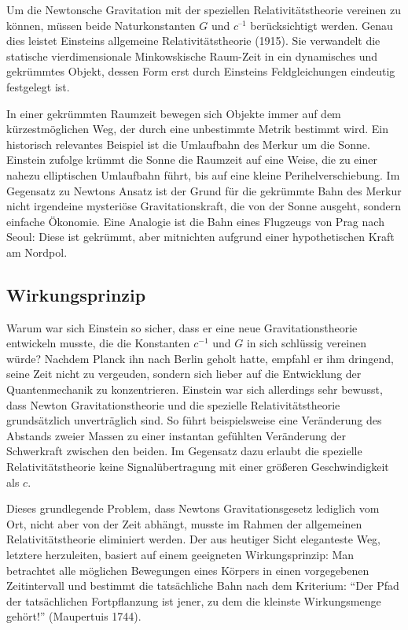 
\newpage {}
\label{sec:1100}

Um die Newtonsche Gravitation mit der speziellen Relativitätstheorie vereinen zu können, müssen beide Naturkonstanten $G$ und $c^{–1}$ berücksichtigt werden. Genau dies leistet Einsteins allgemeine Relativitätstheorie (1915). Sie verwandelt die statische vierdimensionale Minkowskische Raum-Zeit in ein dynamisches und gekrümmtes Objekt, dessen Form erst durch Einsteins Feldgleichungen eindeutig festgelegt ist.

In einer gekrümmten Raumzeit bewegen sich Objekte immer auf dem kürzestmöglichen Weg, der durch eine unbestimmte Metrik bestimmt wird. Ein historisch relevantes Beispiel ist die Umlaufbahn des Merkur um die Sonne. Einstein zufolge krümmt die Sonne die Raumzeit auf eine Weise, die zu einer nahezu elliptischen Umlaufbahn führt, bis auf eine kleine Perihelverschiebung. Im Gegensatz zu Newtons Ansatz ist der Grund für die gekrümmte Bahn des Merkur nicht irgendeine mysteriöse Gravitationskraft, die von der Sonne ausgeht, sondern einfache Ökonomie. Eine Analogie ist die Bahn eines Flugzeugs von Prag nach Seoul: Diese ist gekrümmt, aber mitnichten aufgrund einer hypothetischen Kraft am Nordpol.


\subsection*{Wirkungsprinzip}

Warum war sich Einstein so sicher, dass er eine neue Gravitationstheorie entwickeln musste, die die Konstanten $c^{−1}$ und $G$ in sich schlüssig vereinen würde? Nachdem Planck ihn nach Berlin geholt hatte, empfahl er ihm dringend, seine Zeit nicht zu vergeuden, sondern sich lieber auf die Entwicklung der Quantenmechanik zu konzentrieren. Einstein war sich allerdings sehr bewusst, dass Newton Gravitationstheorie und die spezielle Relativitätstheorie grundsätzlich unverträglich sind. So führt beispielsweise eine Veränderung des Abstands zweier Massen zu einer instantan gefühlten Veränderung der Schwerkraft zwischen den beiden. Im Gegensatz dazu erlaubt die spezielle Relativitätstheorie keine Signalübertragung mit einer größeren Geschwindigkeit als $c$.

Dieses grundlegende Problem, dass Newtons Gravitationsgesetz lediglich vom Ort, nicht aber von der Zeit abhängt, musste im Rahmen der allgemeinen Relativitätstheorie eliminiert werden. Der aus heutiger Sicht eleganteste Weg, letztere herzuleiten, basiert auf einem geeigneten Wirkungsprinzip: Man betrachtet alle möglichen Bewegungen eines Körpers in einen vorgegebenen Zeitintervall und bestimmt die tatsächliche Bahn nach dem Kriterium: \enquote{Der Pfad der tatsächlichen Fortpflanzung ist jener, zu dem die kleinste Wirkungsmenge gehört!} (Maupertuis 1744).


